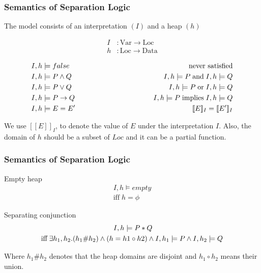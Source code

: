 \documentclass{beamer}
\begin{document}
\begin{frame}
\frametitle{Semantics of Separation Logic}
The model consists of an interpretation $(I)$ and a heap $(h)$

\begin{align*}
    I &: \textrm{Var} \to \textrm{Loc} \\ 
    h &: \textrm{Loc} \to \textrm{Data}
\end{align*}

\begin{align*}
    I,h &\models false \hspace{3.5cm}     & \textrm {never satisfied} \\
    I,h &\models P \land Q \hspace{3.5cm} & I,h \models P \; \textrm{and} \; I,h \models Q \\
    I,h &\models P \lor Q \hspace{3.5cm} & I,h \models P \; \textrm{or} \; I,h \models Q \\
    I,h &\models P \to Q \hspace{3.5cm} & I,h \models P \; \textrm{implies} \; I,h \models Q \\
    I,h &\models E = E' \hspace{3.5cm} & [\![ E ]\!]_I = [\![ E' ]\!]_I
\end{align*}

We use $[\![E]\!]_I$, to denote the value of $E$ under the interpretation $I$. Also, the domain of $h$ should be a subset of $Loc$ and it can be
a partial function.
\end{frame}

\begin{frame}
\frametitle{Semantics of Separation Logic}

Empty heap
\begin{align*}
    I,h \models empty \\ 
    \textrm{iff} \; h = \phi
\end{align*}

Separating conjunction
\begin{align*}
    I,h \models P * Q \hspace{3.5cm} \\ 
    \textrm{iff} \; \exists h_1,h_2.(h_1 \# h_2) \land (h = h1 \circ h2) \land I,h_1 \models P \land I,h_2 \models Q \\
\end{align*}

Where $h_1 \# h_2$ denotes that the heap domains are disjoint and $h_1 \circ h_2$ means their union. \\
\end{frame}
\end{document}
